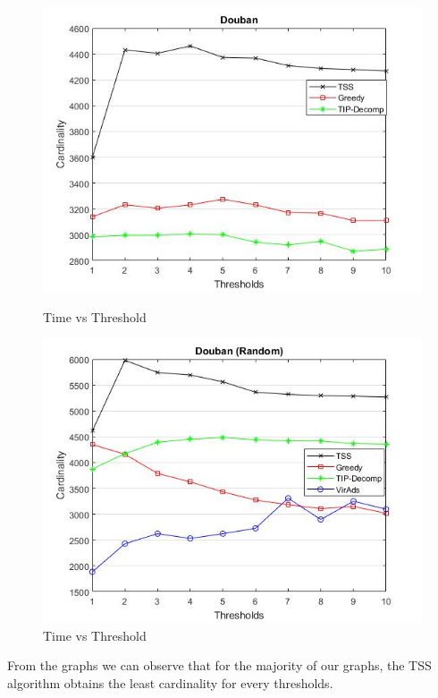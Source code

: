 \begin{figure}[h!]
\begin{minipage}[t]{0.50\textwidth}
\includegraphics[width=\linewidth,keepaspectratio=true]{images/doubantime.jpg}
\caption{Time vs Threshold}

\end{minipage}
\begin{minipage}[t]{0.50\textwidth}
\includegraphics[width=\linewidth,keepaspectratio=true]{images/doubantimerandom.jpg}
\caption{Time vs Threshold}
\end{minipage}
\end{figure}

From the graphs we can observe that for the majority of our graphs, the TSS algorithm obtains the least cardinality for every thresholds.
